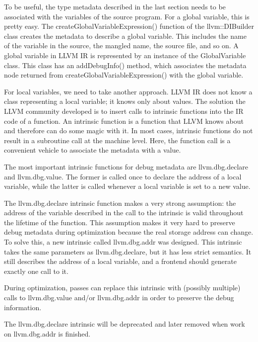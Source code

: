 To be useful, the type metadata described in the last section needs to be associated with the variables of the source program. For a global variable, this is pretty easy. The createGlobalVariableExpression() function of the llvm::DIBuilder class creates the metadata to describe a global variable. This includes the name of the variable in the source, the mangled name, the source file, and so on. A global variable in LLVM IR is represented by an instance of the GlobalVariable class. This class has an addDebugInfo() method, which associates the metadata node returned from createGlobalVariableExpression() with the global variable.\par

For local variables, we need to take another approach. LLVM IR does not know a class representing a local variable; it knows only about values. The solution the LLVM community developed is to insert calls to intrinsic functions into the IR code of a function. An intrinsic function is a function that LLVM knows about and therefore can do some magic with it. In most cases, intrinsic functions do not result in a subroutine call at the machine level. Here, the function call is a convenient vehicle to associate the metadata with a value.\par

The most important intrinsic functions for debug metadata are llvm.dbg.declare and llvm.dbg.value. The former is called once to declare the address of a local variable, while the latter is called whenever a local variable is set to a new value.\par

\begin{tcolorbox}[colback=blue!5!white,colframe=blue!75!black, title=Future LLVM versions will replace llvm.dbg.declare with the llvm.dbg.addr intrinsic]
The llvm.dbg.declare intrinsic function makes a very strong assumption: the address of the variable described in the call to the intrinsic is valid throughout the lifetime of the function. This assumption makes it very hard to preserve debug metadata during optimization because the real storage address can change. To solve this, a new intrinsic called llvm.dbg.addr was designed. This intrinsic takes the same parameters as llvm.dbg.declare, but it has less strict semantics. It still describes the address of a local variable, and a frontend should generate exactly one call to it.\par

During optimization, passes can replace this intrinsic with (possibly multiple) calls to llvm.dbg.value and/or llvm.dbg.addr in order to preserve the debug information.\par

The llvm.dbg.declare intrinsic will be deprecated and later removed 
when work on llvm.dbg.addr is finished.
\end{tcolorbox}


